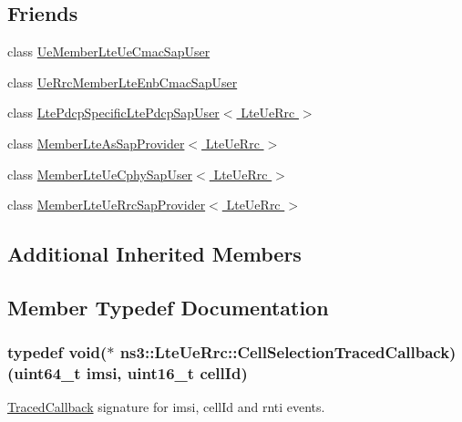\subsection*{Friends}
\begin{DoxyCompactItemize}
\item 
class \hyperlink{classns3_1_1LteUeRrc_a80362a3b9b0782a3a2140bf88b1af11f}{Ue\+Member\+Lte\+Ue\+Cmac\+Sap\+User}
\item 
class \hyperlink{classns3_1_1LteUeRrc_a6ab031be711bdc3f6c8e10a814bf7e0d}{Ue\+Rrc\+Member\+Lte\+Enb\+Cmac\+Sap\+User}
\item 
class \hyperlink{classns3_1_1LteUeRrc_ad5c840da37dc8cbaa258c2a2ea9544e6}{Lte\+Pdcp\+Specific\+Lte\+Pdcp\+Sap\+User$<$ Lte\+Ue\+Rrc $>$}
\item 
class \hyperlink{classns3_1_1LteUeRrc_a71ef32e92e2313843f2c68f6dfc13413}{Member\+Lte\+As\+Sap\+Provider$<$ Lte\+Ue\+Rrc $>$}
\item 
class \hyperlink{classns3_1_1LteUeRrc_a1cf2b7d7e3eebd8b62d2a3e5d7f880d3}{Member\+Lte\+Ue\+Cphy\+Sap\+User$<$ Lte\+Ue\+Rrc $>$}
\item 
class \hyperlink{classns3_1_1LteUeRrc_a2bbe84ff95ef2065f46cb1b75be340ba}{Member\+Lte\+Ue\+Rrc\+Sap\+Provider$<$ Lte\+Ue\+Rrc $>$}
\end{DoxyCompactItemize}
\subsection*{Additional Inherited Members}


\subsection{Member Typedef Documentation}
\subsubsection[{\texorpdfstring{Cell\+Selection\+Traced\+Callback}{CellSelectionTracedCallback}}]{\setlength{\rightskip}{0pt plus 5cm}typedef void($\ast$  ns3\+::\+Lte\+Ue\+Rrc\+::\+Cell\+Selection\+Traced\+Callback) (uint64\+\_\+t imsi, uint16\+\_\+t cell\+Id)}\hypertarget{classns3_1_1LteUeRrc_a39dd1fb0d6ae8316f5f7edd8bfa6608b}{}\label{classns3_1_1LteUeRrc_a39dd1fb0d6ae8316f5f7edd8bfa6608b}
\hyperlink{classns3_1_1TracedCallback}{Traced\+Callback} signature for imsi, cell\+Id and rnti events.


